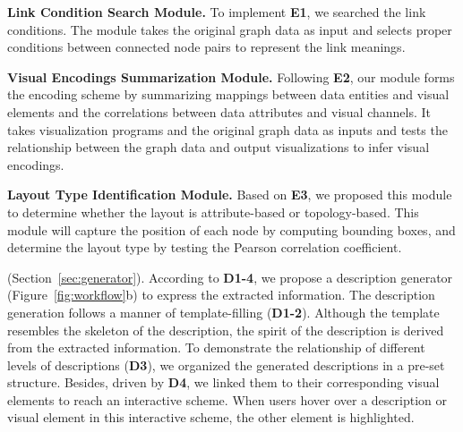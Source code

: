 \begin{compactenum}[\textbf{M}1]
    \item {\bf Link Condition Search Module.}
    To implement \textbf{E1}, we searched the link conditions. The module takes the original graph data as input and selects proper conditions between connected node pairs to represent the link meanings.
    
    \item {\bf Visual Encodings Summarization Module.}
    Following \textbf{E2}, our module forms the encoding scheme by summarizing mappings between data entities and visual elements and the correlations between data attributes and visual channels. It takes visualization programs and the original graph data as inputs and tests the relationship between the graph data and output visualizations to infer visual encodings.
    
    \item {\bf Layout Type Identification Module.} Based on \textbf{E3}, we proposed this module to determine whether the layout is attribute-based or topology-based. This module will capture the position of each node by computing bounding boxes, and determine the layout type by testing the Pearson correlation coefficient.
\end{compactenum}

 (Section~\ref{sec:generator}).
According to \textbf{D1-4}, we propose a description generator
(Figure~\ref{fig:workflow}b) to express the extracted information. 
The description generation follows a manner of template-filling (\textbf{D1-2}). Although the template resembles the skeleton of the description, the spirit of the description is derived from the extracted information.
To demonstrate the relationship of different levels of descriptions (\textbf{D3}), we organized the generated descriptions in a pre-set structure. Besides, driven by \textbf{D4}, we linked them to their corresponding visual elements to reach an interactive scheme. When users hover over a description or visual element in this interactive scheme, the other element is highlighted.
